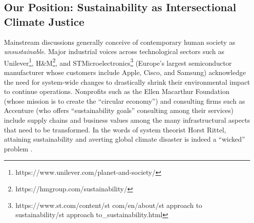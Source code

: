 \documentclass[manuscript,review,anonymous]{acmart}
\begin{document}
\subsection{Our Position: Sustainability as Intersectional Climate Justice}

Mainstream discussions generally conceive of contemporary human society as \textit{unsustainable}. Major industrial voices across technological sectors such as Unilever\footnote{https://www.unilever.com/planet-and-society/}, H\&M\footnote{https://hmgroup.com/sustainability/}, and STMicroelectronics\footnote{https://www.st.com/content/st\textunderscore
com/en/about/st\textunderscore
approach\textunderscore
to\textunderscore
sustainability/st\textunderscore
approach\textunderscore
to\_sustainability.html} (Europe’s largest semiconductor manufacturer whose customers include Apple, Cisco, and Samsung) acknowledge the need for system-wide changes to drastically shrink their environmental impact to continue operations. %
Nonprofits such as the Ellen Macarthur Foundation (whose mission is to create the “circular economy”) and consulting firms such as Accenture (who offers “sustainability goals” consulting among their services) include supply chains and business values among the many infrastructural aspects that need to be transformed. In the words of system theorist Horst Rittel, attaining sustainability and averting global climate disaster is indeed a “wicked” problem \cite{rittel_dilemmas_1969}.
\end{document}

